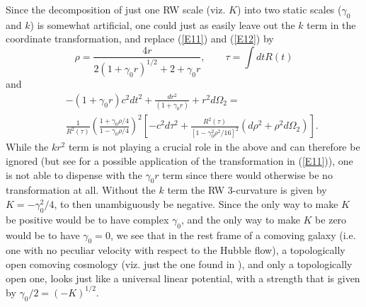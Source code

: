 \documentclass[preprint,aps]{revtex4}
\begin{document}
Since the decomposition of just one RW scale (viz. $K$) into two static scales ($\gamma_0$ and $k$) is somewhat artificial, one could just as easily leave out the $k$ term in the coordinate transformation, and replace (\ref{E11}) and (\ref{E12}) by 
%                                                                               
\begin{equation}
\rho=\frac{4r}{2(1+\gamma_0r)^{1/2}+2 +\gamma_0 r},\qquad \tau=\int dt R(t)
\label{E14}
\end{equation}                                 
%
and
% 
\begin{eqnarray}
&&-(1+\gamma_0r)c^2dt^2+\frac{dr^2}{(1+\gamma_0r)}+r^2d\Omega_2=
\nonumber \\
&&\frac{1}{R^2(\tau)}\left(\frac{1+\gamma_0\rho/4}
{1-\gamma_0\rho/4}\right)^2
\left[-c^2d\tau^2+\frac{R^2(\tau)}{[1-\gamma_0^2\rho^2/16]^2}
\left(d\rho^2+\rho^2d\Omega_2\right)\right].
\label{E15}
\end{eqnarray} 
%
While the $kr^2$ term is not playing a crucial role in the above and can therefore be ignored (but see \cite{Vareschi2010} for a possible application of the transformation in (\ref{E11})), one is not able to dispense with the $\gamma_0 r$ term since there would otherwise be no transformation at all. Without the $k$ term the RW 3-curvature is given by $K=-\gamma_0^2/4$, to then unambiguously be negative. Since the only way to make $K$ be positive would be to have complex $\gamma_0$, and the only way to make $K$ be zero would be to have  $\gamma_0=0$, we see that in the rest frame of a comoving galaxy (i.e. one with no peculiar velocity with respect to the Hubble flow), a topologically open comoving cosmology (viz. just the one found in \cite{Mannheim2006}), and only a topologically open one, looks just like a universal linear potential, with a strength that is given by $\gamma_0/2=(-K)^{1/2}$. 
\end{document}
